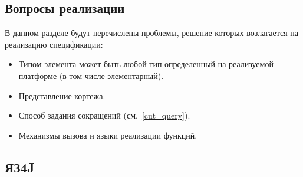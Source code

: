 \subsection{Вопросы реализации}
В данном разделе будут перечислены проблемы, решение которых возлагается на реализацию
спецификации:
\begin{itemize}
    \item Типом элемента может быть любой тип определенный на реализуемой платформе (в том числе элементарный).

    \item Представление кортежа.

    \item Способ задания сокращений (см.~\ref{cut_query}).

    \item Механизмы вызова и языки реализации функций.

\end{itemize}


\subsection{ЯЗ4J}
